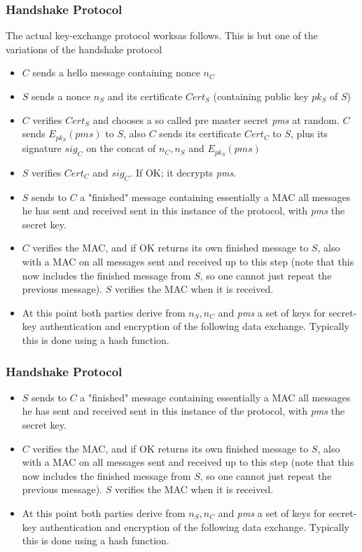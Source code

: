 \documentclass[14pt]{beamer}
\begin{document}
                \begin{frame}
                    \frametitle{Handshake Protocol}
                        The actual key-exchange protocol worksas follows. This is but one of the variations of the handshake protocol
                        \begin{itemize}
                            \item $C$ sends a hello message containing nonce $n_C$
                            \item $S$ sends a nonce $n_S$ and its certificate $Cert_S$ (containing public key $pk_S$ of $S$)
                            \item $C$ verifies $Cert_S$ and chooses a so called pre master secret \textit{pms} at random. $C$ sends $E_{pk_S}(pms)$ to $S$, also $C$ sends its certificate $Cert_C$ to $S$, plus its signature $sig_C$ on the concat of $n_C, n_S$ and $E_{pk_S}(pms)$
                            \item $S$ verifies $Cert_C$ and $sig_C$. If OK; it decrypts \textit{pms}. 
                            \item $S$ sends to $C$ a "finished" message containing essentially a MAC all messages he has sent and received sent in this instance of the protocol, with \textit{pms} the secret key.
                            \item $C$ verifies the MAC, and if OK returns its own finished message to $S$, also with a MAC on all messages sent and received up to this step (note that this now includes the finished message from $S$, so one cannot just repeat the previous message). $S$ verifies the MAC when it is received.
                            \item At this point both parties derive from $n_S,n_C$ and \textit{pms} a set of keys for secret-key authentication and encryption of the following data exchange. Typically this is done using a hash function.
                        \end{itemize}
                \end{frame}
            \begin{frame}
                \frametitle{Handshake Protocol}
                    \begin{itemize}
                        \item $S$ sends to $C$ a "finished" message containing essentially a MAC all messages he has sent and received sent in this instance of the protocol, with \textit{pms} the secret key.
                        \item $C$ verifies the MAC, and if OK returns its own finished message to $S$, also with a MAC on all messages sent and received up to this step (note that this now includes the finished message from $S$, so one cannot just repeat the previous message). $S$ verifies the MAC when it is received.
                        \item At this point both parties derive from $n_S,n_C$ and \textit{pms} a set of keys for secret-key authentication and encryption of the following data exchange. Typically this is done using a hash function.
                    \end{itemize}
            \end{frame}
\end{document}
